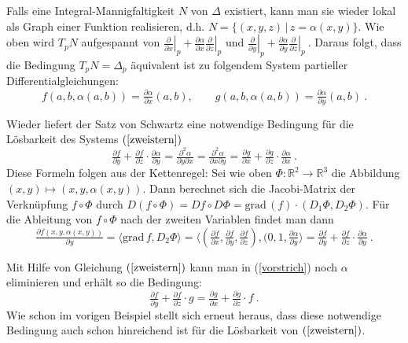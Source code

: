 \documentclass[12pt,a4paper]{article}
\def\R{\mathbb{R}}
\def\grad{\mathrm{grad}\,}
\def\la{\langle}
\def\ra{\rangle}
\begin{document}
Falls eine Integral-Mannigfaltigkeit $N$ von $\Delta$ existiert, kann man sie wieder lokal als
Graph einer Funktion realisieren, d.h.
$
N = \{ (x,y,z) \,|\, z = \alpha(x,y)\}
$.
Wie oben wird $T_pN$ aufgespannt von
$
\left. \tfrac{\partial }{\partial x}\right|_p + \tfrac{\partial \alpha}{\partial x} \left. \tfrac{\partial }{\partial z}\right|_p
$
und
$
\left. \tfrac{\partial }{\partial y}\right|_p
+ \tfrac{\partial \alpha}{\partial y}\left. \tfrac{\partial }{\partial z}\right|_p \ .
$
Daraus folgt, dass die Bedingung $T_pN = \Delta_p$ \"aquivalent ist zu folgendem System partieller
Differentialgleichungen:
\begin{equation}\label{zweistern}
f(a,b,\alpha(a,b)) = \tfrac{\partial \alpha}{\partial x}(a,b),\qquad
g(a,b,\alpha(a,b)) = \tfrac{\partial \alpha}{\partial y}(a,b) \ .
\end{equation}

Wieder liefert der Satz von Schwartz eine notwendige Bedingung f\"ur die L\"osbarkeit des Systems $(\ref{zweistern})$
\begin{equation}\label{vorstrich}
\tfrac{\partial f}{\partial y} + \tfrac{\partial f}{\partial z}\cdot \tfrac{\partial \alpha}{\partial y}
=
\tfrac{\partial^2 \alpha}{\partial y\partial x}
=
\tfrac{\partial^2 \alpha }{\partial x \partial y}
=
\tfrac{\partial g}{\partial x} + \tfrac{\partial g}{\partial z}\cdot \tfrac{\partial \alpha}{\partial x} \ .
\end{equation}
Diese Formeln folgen aus der Kettenregel: Sei wie oben $\Phi:\R^2 \rightarrow \R^3$ die Abbildung
$(x,y)\mapsto (x,y,\alpha(x,y))$. Dann berechnet sich die Jacobi-Matrix der Verkn\"upfung $f\circ \Phi$ durch
$D(f\circ \Phi) = Df \circ D\Phi = \grad (f) \cdot (D_1\Phi, D_2\Phi)$. F\"ur die Ableitung von $f\circ \Phi$
nach der zweiten Variablen findet man dann
$$
\tfrac{\partial f(x,y,\alpha(x,y))}{\partial y} = \la \grad f, D_2\Phi \ra
=
\la(\tfrac{\partial f}{\partial x},\tfrac{\partial f}{\partial y},\tfrac{\partial f}{\partial z}),
(0,1,\tfrac{\partial \alpha}{\partial y}\ra
=
\tfrac{\partial f}{\partial y} + \tfrac{\partial f}{\partial z}\cdot \tfrac{\partial \alpha}{\partial y} \ .
$$

Mit Hilfe von Gleichung $(\ref{zweistern})$ kann man in (\ref{vorstrich}) noch $\alpha\,$ eliminieren und erh\"alt
so die Bedingung:
\begin{equation}\label{strich}
\tfrac{\partial f}{\partial y} + \tfrac{\partial f}{\partial z}\cdot g
=
\tfrac{\partial g}{\partial x} + \tfrac{\partial g}{\partial z}\cdot f  \ .
\end{equation}
Wie schon im vorigen Beispiel stellt sich erneut heraus, dass diese notwendige Bedingung auch schon hinreichend
ist f\"ur die L\"osbarkeit von $(\ref{zweistern})$.
\end{document}

